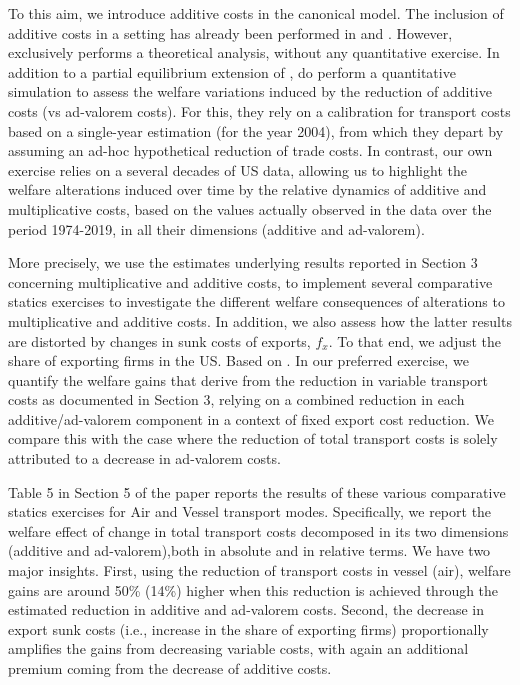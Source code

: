 \documentclass[a4paper,11pt]{article}
\begin{document}
To this aim, we introduce additive costs in the canonical \citet{melitz} model. The inclusion of additive costs in a \citet{melitz} setting has already been performed in \citet{sorensen2014} and \citet{Irrazabal_2015}. However, \citet{sorensen2014} exclusively performs a theoretical analysis, without any quantitative exercise. In addition to a partial equilibrium extension of \citet{melitz}, \citet{Irrazabal_2015} do perform a quantitative simulation to assess the welfare variations induced by the reduction of additive costs (vs ad-valorem costs). For this, they rely on a calibration for transport costs based on a single-year estimation (for the year 2004), from which they depart by assuming an ad-hoc hypothetical reduction of trade costs. In contrast, our own exercise relies on a several decades of US data, allowing us to highlight the welfare alterations induced over time by the relative dynamics of additive and multiplicative costs, based on the values actually observed in the data over the period 1974-2019, in all their dimensions (additive and ad-valorem).\smallskip

More precisely, we use the estimates underlying results reported in Section 3 concerning multiplicative and additive costs, to implement several comparative statics exercises to investigate the different welfare consequences of alterations to multiplicative and additive costs. In addition, we also assess how the latter results are distorted by changes in sunk costs of exports, $f_{x}$. To that end, we adjust the share of exporting firms in the US. Based on \citet{BEJK-AER-03, Lincoln_McCallum2018}. In our preferred exercise, we quantify the welfare gains that derive from the reduction in variable transport costs as documented in Section 3, relying on a combined reduction in each additive/ad-valorem component in a context of fixed export cost reduction. We compare this with the case where the reduction of total transport costs  is solely attributed to a decrease in ad-valorem costs.

Table 5 in Section 5 of the paper reports the results of these various comparative statics exercises for Air and Vessel transport modes. Specifically, we report the welfare effect of change in total transport costs decomposed in its two dimensions (additive and ad-valorem),both in absolute and in relative terms. We have two major insights. First, using the reduction of transport costs in vessel (air),  welfare gains are around 50\% (14\%) higher when this reduction is achieved through the estimated reduction in additive and ad-valorem costs. Second, the decrease in export sunk costs (i.e., increase in the share of exporting firms) proportionally amplifies the gains from decreasing variable costs, with again an additional premium coming from the decrease of additive costs.
\end{document}
